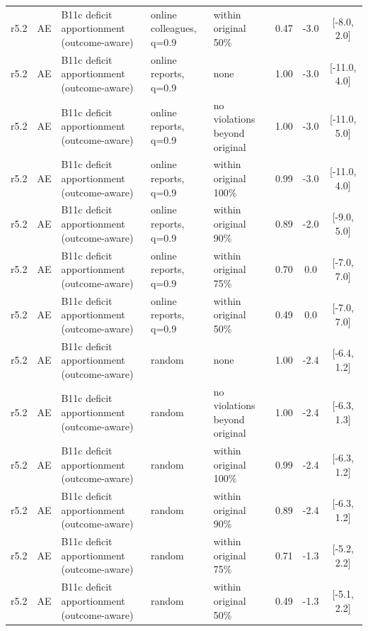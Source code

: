 \documentclass[10pt,onecolumn,letterpaper]{article}
\begin{document}
\begin{longtable}{lllp{4.2cm}p{3.4cm}ccc}
r5.2 & AE & B11c deficit apportionment (outcome-aware) & online colleagues, q=0.9 & within original 50\% & 0.47 & -3.0 & [-8.0, 2.0] \\
r5.2 & AE & B11c deficit apportionment (outcome-aware) & online reports, q=0.9 & none & 1.00 & -3.0 & [-11.0, 4.0] \\
r5.2 & AE & B11c deficit apportionment (outcome-aware) & online reports, q=0.9 & no violations beyond original & 1.00 & -3.0 & [-11.0, 5.0] \\
r5.2 & AE & B11c deficit apportionment (outcome-aware) & online reports, q=0.9 & within original 100\% & 0.99 & -3.0 & [-11.0, 4.0] \\
r5.2 & AE & B11c deficit apportionment (outcome-aware) & online reports, q=0.9 & within original 90\% & 0.89 & -2.0 & [-9.0, 5.0] \\
r5.2 & AE & B11c deficit apportionment (outcome-aware) & online reports, q=0.9 & within original 75\% & 0.70 & 0.0 & [-7.0, 7.0] \\
r5.2 & AE & B11c deficit apportionment (outcome-aware) & online reports, q=0.9 & within original 50\% & 0.49 & 0.0 & [-7.0, 7.0] \\
r5.2 & AE & B11c deficit apportionment (outcome-aware) & random & none & 1.00 & -2.4 & [-6.4, 1.2] \\
r5.2 & AE & B11c deficit apportionment (outcome-aware) & random & no violations beyond original & 1.00 & -2.4 & [-6.3, 1.3] \\
r5.2 & AE & B11c deficit apportionment (outcome-aware) & random & within original 100\% & 0.99 & -2.4 & [-6.3, 1.2] \\
r5.2 & AE & B11c deficit apportionment (outcome-aware) & random & within original 90\% & 0.89 & -2.4 & [-6.3, 1.2] \\
r5.2 & AE & B11c deficit apportionment (outcome-aware) & random & within original 75\% & 0.71 & -1.3 & [-5.2, 2.2] \\
r5.2 & AE & B11c deficit apportionment (outcome-aware) & random & within original 50\% & 0.49 & -1.3 & [-5.1, 2.2] \\
\bottomrule
\end{longtable}
\end{document}
